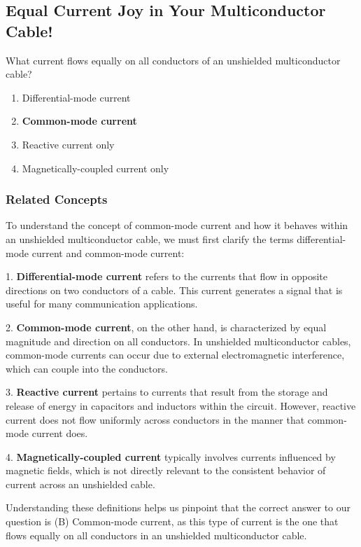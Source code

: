 \subsection{Equal Current Joy in Your Multiconductor Cable!}

\begin{tcolorbox}[colback=gray!10, colframe=black, title=E4E08] What current flows equally on all conductors of an unshielded multiconductor cable?
\begin{enumerate}[label=\Alph*.]
    \item Differential-mode current
    \item \textbf{Common-mode current}
    \item Reactive current only
    \item Magnetically-coupled current only
\end{enumerate} \end{tcolorbox}

\subsubsection{Related Concepts}
To understand the concept of common-mode current and how it behaves within an unshielded multiconductor cable, we must first clarify the terms differential-mode current and common-mode current:

1. \textbf{Differential-mode current} refers to the currents that flow in opposite directions on two conductors of a cable. This current generates a signal that is useful for many communication applications. 

2. \textbf{Common-mode current}, on the other hand, is characterized by equal magnitude and direction on all conductors. In unshielded multiconductor cables, common-mode currents can occur due to external electromagnetic interference, which can couple into the conductors.

3. \textbf{Reactive current} pertains to currents that result from the storage and release of energy in capacitors and inductors within the circuit. However, reactive current does not flow uniformly across conductors in the manner that common-mode current does.

4. \textbf{Magnetically-coupled current} typically involves currents influenced by magnetic fields, which is not directly relevant to the consistent behavior of current across an unshielded cable.

Understanding these definitions helps us pinpoint that the correct answer to our question is (B) Common-mode current, as this type of current is the one that flows equally on all conductors in an unshielded multiconductor cable.

